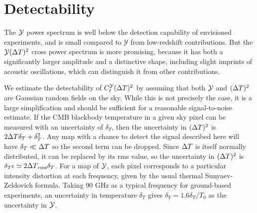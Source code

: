 \documentclass[fleqn,usenatbib]{mnras}
\begin{document}


\section{Detectability} \label{sec:detectability}

    The $\mathcal{Y}$ power spectrum is well below the detection capability of
    envisioned experiments, and is small compared to $\mathcal Y$ from
    low-redshift contributions.  But the ${\mathcal{Y}}({\Delta T})^2$ cross power
    spectrum is more promising, because it has both a significantly larger
    amplitude and a distinctive shape, including slight imprints of acoustic
    oscillations, which can distinguish it from other contributions.

    We estimate the detectability of $C_\ell^{\mathcal{Y}}({\Delta T})^2$ by assuming that
    both $\mathcal{Y}$ and $({\Delta T})^2$ are Gaussian random fields on the sky.  While
    this is not precisely the case, it is a large simplification and should be
    sufficient for a reasonable signal-to-noise estimate.  If the CMB blackbody
    temperature in a given sky pixel can be measured with an uncertainty of
    $\delta_T$, then the uncertainty in $({\Delta T})^2$ is $2{\Delta T}\delta_T +
    \delta_T^2$.  Any map with a chance to detect the signal described here will
    have $\delta_T \ll {\Delta T}$ so the second term can be dropped.  Since
    ${\Delta T}$ is itself normally distributed, it can be replaced by its rms
    value, so the uncertainty in $({\Delta T})^2$ is $\delta_{T^2} \simeq
    2{\Delta T}_{\rm rms}\delta_T$.  For a map of $\mathcal{Y}$, each pixel corresponds to
    a particular intensity distortion at each frequency, given by the usual
    thermal Sunyaev-Zeldovich formula.  Taking 90 GHz as a typical frequency for
    ground-based experiments, an uncertainty in temperature $\delta_T$ gives
    $\delta_Y = 1.6 \delta_T / T_0$ as the uncertainty in $\mathcal{Y}$.
\end{document}
